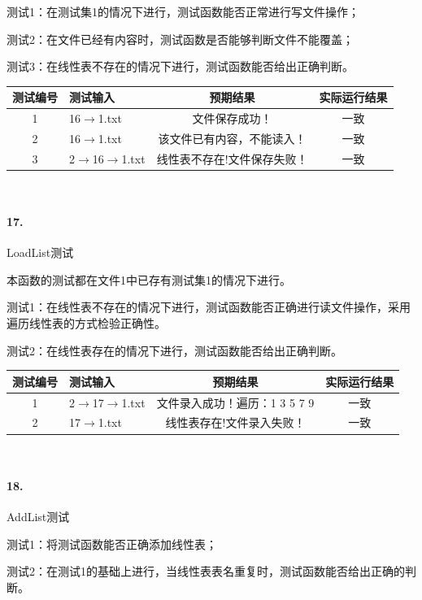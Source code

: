 \documentclass[supercite]{Experimental_Report}
\theoremstyle{definition}
\begin{document}
测试1：在测试集1的情况下进行，测试函数能否正常进行写文件操作；

测试2：在文件已经有内容时，测试函数是否能够判断文件不能覆盖；

测试3：在线性表不存在的情况下进行，测试函数能否给出正确判断。

\vspace{0.5em}

\begin{tabular}{|c|p{2.7cm}|c|c|}
	\hline
	测试编号 & 测试输入 & 预期结果 & 实际运行结果 \\
	\hline
	1 & 16$\rightarrow$1.txt & 文件保存成功！ & 一致 \\
	\hline
	2 & 16$\rightarrow$1.txt & 该文件已有内容，不能读入！ & 一致 \\
	\hline
	3 & 2$\rightarrow$16$\rightarrow$1.txt & 线性表不存在!文件保存失败！ & 一致 \\
	\hline
\end{tabular}

~\

\paragraph{17.}LoadList测试
	
本函数的测试都在文件1中已存有测试集1的情况下进行。

测试1：在线性表不存在的情况下进行，测试函数能否正确进行读文件操作，采用遍历线性表的方式检验正确性。

测试2：在线性表存在的情况下进行，测试函数能否给出正确判断。

\vspace{0.5em}

\begin{tabular}{|c|p{2.7cm}|c|c|}
	\hline
	测试编号 & 测试输入 & 预期结果 & 实际运行结果 \\
	\hline
	1 & 2$\rightarrow$17$\rightarrow$1.txt & 文件录入成功！遍历：1 3 5 7 9 & 一致 \\
	\hline
	2 & 17$\rightarrow$1.txt & 线性表存在!文件录入失败！ & 一致 \\
	\hline
\end{tabular}

~\

\paragraph{18.}AddList测试

测试1：将测试函数能否正确添加线性表；

测试2：在测试1的基础上进行，当线性表表名重复时，测试函数能否给出正确的判断。
\end{document}
